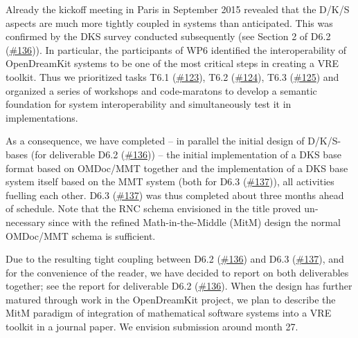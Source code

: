 Already the kickoff meeting in Paris in September 2015 revealed that the
D/K/S aspects are much more tightly coupled in systems than anticipated.
This was confirmed by the DKS survey conducted subsequently (see Section
2 of D6.2
(\href{https://github.com/OpenDreamKit/OpenDreamKit/issues/136}{\#136})).
In particular, the participants of WP6 identified the interoperability
of OpenDreamKit systems to be one of the most critical steps in creating
a VRE toolkit. Thus we prioritized tasks T6.1
(\href{https://github.com/OpenDreamKit/OpenDreamKit/issues/123}{\#123}),
T6.2
(\href{https://github.com/OpenDreamKit/OpenDreamKit/issues/124}{\#124}),
T6.3
(\href{https://github.com/OpenDreamKit/OpenDreamKit/issues/125}{\#125})
and organized a series of workshops and code-maratons to develop a
semantic foundation for system interoperability and simultaneously test
it in implementations.

As a consequence, we have completed -- in parallel the initial design of
D/K/S-bases (for deliverable D6.2
(\href{https://github.com/OpenDreamKit/OpenDreamKit/issues/136}{\#136}))
-- the initial implementation of a DKS base format based on OMDoc/MMT
together and the implementation of a DKS base system itself based on the
MMT system (both for D6.3
(\href{https://github.com/OpenDreamKit/OpenDreamKit/issues/137}{\#137})),
all activities fuelling each other. D6.3
(\href{https://github.com/OpenDreamKit/OpenDreamKit/issues/137}{\#137})
was thus completed about three months ahead of schedule. Note that the
RNC schema envisioned in the title proved un-necessary since with the
refined Math-in-the-Middle (MitM) design the normal OMDoc/MMT schema is
sufficient.

Due to the resulting tight coupling between D6.2
(\href{https://github.com/OpenDreamKit/OpenDreamKit/issues/136}{\#136})
and D6.3
(\href{https://github.com/OpenDreamKit/OpenDreamKit/issues/137}{\#137}),
and for the convenience of the reader, we have decided to report on both
deliverables together; see the report for deliverable D6.2
(\href{https://github.com/OpenDreamKit/OpenDreamKit/issues/136}{\#136}).
When the design has further matured through work in the OpenDreamKit
project, we plan to describe the MitM paradigm of integration of
mathematical software systems into a VRE toolkit in a journal paper. We
envision submission around month 27.
